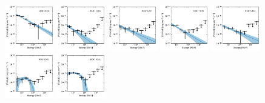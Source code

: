 \documentclass[doublespace,nopageskip]{VTthesis}
\begin{document}
\begin{appendices}
\begin{figure}
\centering
\includegraphics[width=0.19\textwidth]{Figures/Globular/spectra/PL_spectrum_0.pdf}
\includegraphics[width=0.19\textwidth]{Figures/Globular/spectra/PL_spectrum_4.pdf}
\includegraphics[width=0.19\textwidth]{Figures/Globular/spectra/PL_spectrum_16.pdf}
\includegraphics[width=0.19\textwidth]{Figures/Globular/spectra/PL_spectrum_26.pdf}
\includegraphics[width=0.19\textwidth]{Figures/Globular/spectra/PL_spectrum_7.pdf}
\includegraphics[width=0.19\textwidth]{Figures/Globular/spectra/PLE_spectrum_14.pdf}
\includegraphics[width=0.19\textwidth]{Figures/Globular/spectra/PLE_spectrum_21.pdf}

\end{figure}
\end{appendices}
\end{document}
